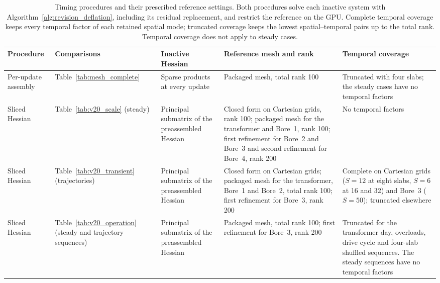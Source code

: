 \begin{table}[pos=htbp]
\centering\footnotesize\setlength{\tabcolsep}{3pt}
\caption{Timing procedures and their prescribed reference settings. Both procedures
solve each inactive system with Algorithm~\ref{alg:revision_deflation}, including its
residual replacement, and restrict the reference on the GPU. Complete temporal coverage
keeps every temporal factor of each retained spatial mode; truncated coverage keeps the
lowest spatial--temporal pairs up to the total rank. Temporal coverage does not apply to
steady cases.}
\label{tab:procedures}
\begin{tabularx}{\textwidth}{@{}>{\raggedright\arraybackslash}p{}>{\raggedright\arraybackslash}p{}>{\raggedright\arraybackslash}p{}>{\raggedright\arraybackslash}X>{\raggedright\arraybackslash}p{}@{}}
\toprule
Procedure & Comparisons & Inactive Hessian & Reference mesh and rank & Temporal coverage \\
\midrule
Per-update assembly & Table~\ref{tab:mesh_complete} & Sparse products at every update &
Packaged mesh, total rank 100 & Truncated with four slabs; the steady cases have no
temporal factors \\
Sliced Hessian & Table~\ref{tab:v20_scale} (steady) & Principal submatrix of the
preassembled Hessian & Closed form on Cartesian grids, rank 100; packaged mesh for the
transformer and Bore~1, rank 100; first refinement for Bore~2 and Bore~3 and second
refinement for Bore~4, rank 200 & No temporal factors \\
Sliced Hessian & Table~\ref{tab:v20_transient} (trajectories) & Principal submatrix of
the preassembled Hessian & Closed form on Cartesian grids; packaged mesh for the
transformer, Bore~1 and Bore~2, total rank 100; first refinement for Bore~3, rank 200 &
Complete on Cartesian grids ($S=12$ at eight slabs, $S=6$ at 16 and 32) and Bore~3
($S=50$); truncated elsewhere \\
Sliced Hessian & Table~\ref{tab:v20_operation} (steady and trajectory sequences) &
Principal submatrix of the preassembled Hessian & Packaged mesh, total rank 100; first
refinement for Bore~3, rank 200 & Truncated for the transformer day, overloads, drive
cycle and four-slab shuffled sequences. The steady sequences have no temporal
factors \\
\bottomrule
\end{tabularx}
\end{table}

